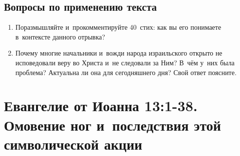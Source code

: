 \documentclass[a4paper,12pt]{article}
\begin{document}
\subsection*{Вопросы по применению текста} 
\begin{enumerate}
    \item Поразмышляйте и~прокомментируйте 40~стих: как вы его понимаете в~контексте данного отрывка? 
    
    \myline
    
    \myline
    \item Почему многие начальники и~вожди народа израильского открыто не исповедовали веру во Христа и~не следовали за Ним? В~чём у~них была проблема? Актуальна ли она для сегодняшнего дня? Свой ответ поясните. 
    
    \myline
    
    \myline
\end{enumerate}



\section{Евангелие от Иоанна 13:1-38. Омовение ног и~последствия этой символической акции}
\end{document}
